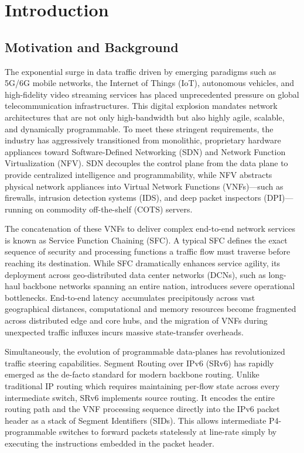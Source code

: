 \documentclass[12pt, a4paper, reqno, oneside]{book}
\begin{document}
\newpage
\pagestyle{fancy}

\chapter{Introduction}
\label{chap:introduction}

\section{Motivation and Background}
The exponential surge in data traffic driven by emerging paradigms such as 5G/6G mobile networks, the Internet of Things (IoT), autonomous vehicles, and high-fidelity video streaming services has placed unprecedented pressure on global telecommunication infrastructures. This digital explosion mandates network architectures that are not only high-bandwidth but also highly agile, scalable, and dynamically programmable. To meet these stringent requirements, the industry has aggressively transitioned from monolithic, proprietary hardware appliances toward Software-Defined Networking (SDN) and Network Function Virtualization (NFV). SDN decouples the control plane from the data plane to provide centralized intelligence and programmability, while NFV abstracts physical network appliances into Virtual Network Functions (VNFs)—such as firewalls, intrusion detection systems (IDS), and deep packet inspectors (DPI)—running on commodity off-the-shelf (COTS) servers. 

The concatenation of these VNFs to deliver complex end-to-end network services is known as Service Function Chaining (SFC). A typical SFC defines the exact sequence of security and processing functions a traffic flow must traverse before reaching its destination. While SFC dramatically enhances service agility, its deployment across geo-distributed data center networks (DCNs), such as long-haul backbone networks spanning an entire nation, introduces severe operational bottlenecks. End-to-end latency accumulates precipitously across vast geographical distances, computational and memory resources become fragmented across distributed edge and core hubs, and the migration of VNFs during unexpected traffic influxes incurs massive state-transfer overheads.

Simultaneously, the evolution of programmable data-planes has revolutionized traffic steering capabilities. Segment Routing over IPv6 (SRv6) has rapidly emerged as the de-facto standard for modern backbone routing. Unlike traditional IP routing which requires maintaining per-flow state across every intermediate switch, SRv6 implements source routing. It encodes the entire routing path and the VNF processing sequence directly into the IPv6 packet header as a stack of Segment Identifiers (SIDs). This allows intermediate P4-programmable switches to forward packets statelessly at line-rate simply by executing the instructions embedded in the packet header.
\end{document}
